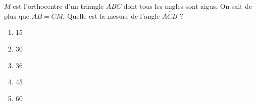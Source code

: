 $M$ est l'orthocentre d'un triangle $ABC$ dont tous les angles sont aigus. On sait de plus que $AB=CM$. Quelle est la mesure de l'angle $\widehat{ACB}$ ?
\begin{multicols}{5}
\begin{enumerate}[A/]
\item 15\degres
\item 30\degres
\item 36\degres
\item 45\degres
\item 60\degres
\end{enumerate}
\end{multicols}